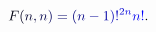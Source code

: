 \documentclass[12pt]{article}
\begin{document}
\makeatletter
\renewcommand*{\@textcolor}[3]{%
  \protect\leavevmode
  \begingroup
    \color#1{#2}#3%
  \endgroup
}
\makeatother
\begin{displaymath}
\mathcolor[RGB]{0,0,15}{F} \mathcolor[RGB]{0,0,30}{(} \mathcolor[RGB]{0,0,45}{n} \mathcolor[RGB]{0,0,60}{,} \mathcolor[RGB]{0,0,75}{n} \mathcolor[RGB]{0,0,90}{)} \mathcolor[RGB]{0,0,105}{=} \mathcolor[RGB]{0,0,120}{(} \mathcolor[RGB]{0,0,135}{n} \mathcolor[RGB]{0,0,150}{-} \mathcolor[RGB]{0,0,165}{1} \mathcolor[RGB]{0,0,180}{)} \mathcolor[RGB]{0,0,195}{!} ^ { \mathcolor[RGB]{0,0,210}{2} \mathcolor[RGB]{0,0,225}{n} } \mathcolor[RGB]{0,0,240}{n} \mathcolor[RGB]{0,0,255}{!} \mathcolor[RGB]{0,15,0}{.}
\end{displaymath}
\end{document}
